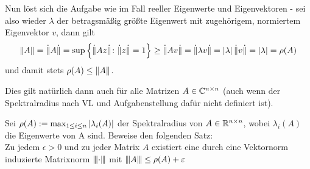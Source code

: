 \begin{exercisePage}
	Nun löst sich die Aufgabe wie im Fall reeller Eigenwerte und Eigenvektoren - sei also wieder $\lambda$ der betragsmäßig größte Eigenwert mit zugehörigem, normiertem Eigenvektor $v$, dann gilt
	\begin{equation*}
		\left\lVert A \right\rVert = \dot{\Vert} A \dot{\Vert} = \sup \left\{ \dot{\Vert} Az \dot{\Vert} \colon \dot{\Vert} z \dot{\Vert} = 1 \right\} \geq \dot{\Vert} Av \dot{\Vert} = \dot{\Vert} \lambda v \dot{\Vert} = \left| \lambda \right| \dot{\Vert} v \dot{\Vert} = \left| \lambda \right| = \rho(A)
	\end{equation*}
	und damit stets $\rho(A) \leq \left\lVert A \right\rVert$.
	
	Dies gilt natürlich dann auch für alle Matrizen $A \in \mathbb{C}^{n \times n}$ (auch wenn der Spektralradius nach VL und Aufgabenstellung dafür nicht definiert ist).
	
	\begin{exercise}
		Sei $\rho(A) \mathrel{:=} \max_{1 \leq i \leq n} \left| \lambda_i(A) \right|$ der Spektralradius von $A \in \mathbb{R}^{n \times n}$, wobei $\lambda_i(A)$ die Eigenwerte von
		A sind. Beweise den folgenden Satz: \\
		Zu jedem $\epsilon > 0$ und zu jeder Matrix $A$ existiert eine durch eine Vektornorm induzierte Matrixnorm ${\left\vert\kern-0.25ex\left\vert\kern-0.25ex\left\vert \cdot \right\vert\kern-0.25ex\right\vert\kern-0.25ex\right\vert}$ mit ${\left\vert\kern-0.25ex\left\vert\kern-0.25ex\left\vert A \right\vert\kern-0.25ex\right\vert\kern-0.25ex\right\vert} \leq \rho(A) + \varepsilon$
	\end{exercise}


\end{exercisePage}
